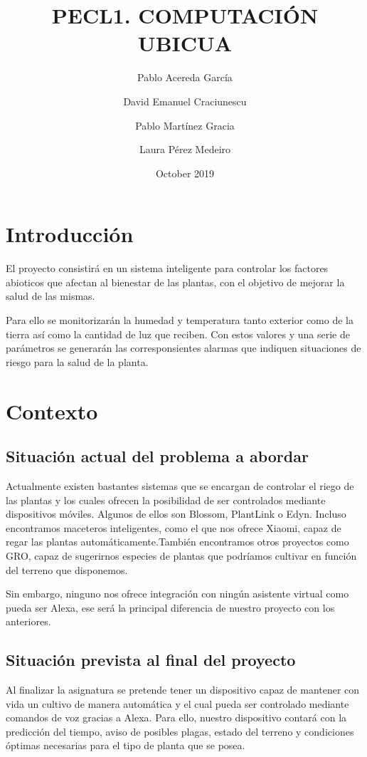 \documentclass[runningheads]{llncs}
\title{PECL1. COMPUTACIÓN UBICUA} %
\author{Pablo Acereda García \and David Emanuel Craciunescu \and Pablo Martínez Gracia \and Laura Pérez Medeiro }
\date{October 2019}
\begin{document}
\maketitle

\section{Introducción}
El proyecto consistirá en un sistema inteligente para controlar los
factores abioticos que afectan al bienestar de las plantas, con el
objetivo de mejorar la salud de las mismas.

Para ello se monitorizarán la humedad y temperatura tanto exterior como
de la tierra así como la cantidad de luz que reciben. Con estos valores
y una serie de parámetros se generarán las corresponsientes alarmas que
indiquen situaciones de riesgo para la salud de la planta.

\section{Contexto}
    \subsection{Situación actual del problema a abordar}
    Actualmente existen bastantes sistemas que se encargan de controlar
    el riego de las plantas y los cuales ofrecen la posibilidad de ser
    controlados mediante dispositivos móviles. Algunos de ellos son
    Blossom, PlantLink o Edyn. Incluso encontramos maceteros
    inteligentes, como el que nos ofrece Xiaomi, capaz de regar las
    plantas automáticamente.También encontramos otros proyectos como
    GRO, capaz de sugerirnos especies de plantas que podríamos cultivar
    en función del terreno que disponemos.
    
    \newline
    Sin embargo, ninguno nos ofrece integración con ningún asistente
    virtual como pueda ser Alexa, ese será la principal diferencia de
    nuestro proyecto con los anteriores.
    
    \subsection{Situación prevista al final del proyecto}
    Al finalizar la asignatura se pretende tener un dispositivo capaz de
    mantener con vida un cultivo de manera automática y el cual pueda
    ser controlado mediante comandos de voz gracias a Alexa.
    Para ello, nuestro dispositivo contará con la predicción del tiempo,
    aviso de posibles plagas, estado del terreno y condiciones óptimas
    necesarias para el tipo de planta que se posea.
    
\end{document}
